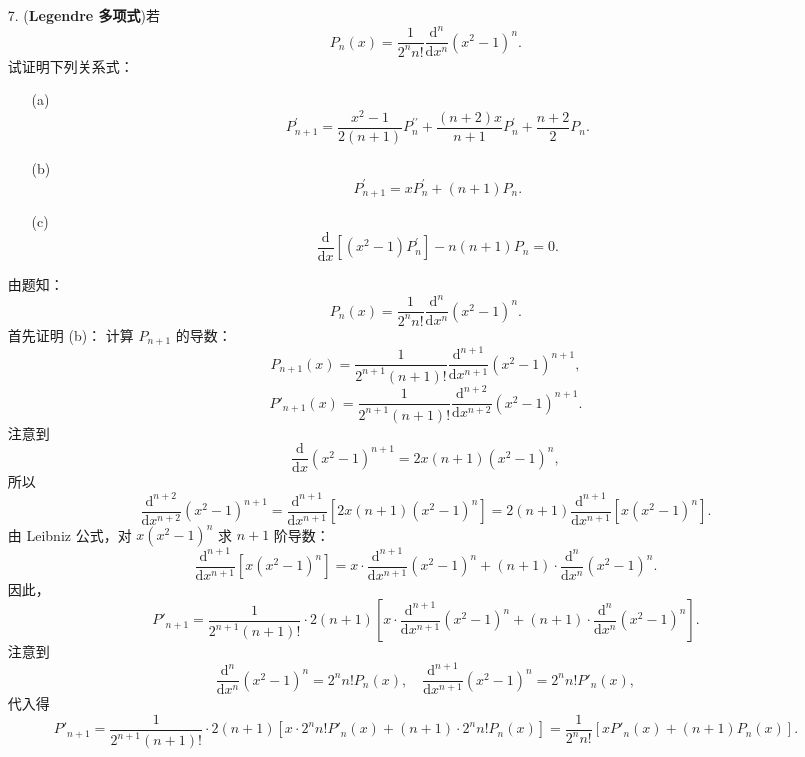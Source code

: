 \begin{enumerate}
    \item[7.](\textbf{Legendre 多项式})若
    \[
        \displaystyle P_n(x)=\frac{1}{2^nn!}\frac{\mathrm{d}^n}{\mathrm{d}x^n}(x^2-1)^n.
    \]
    试证明下列关系式：
    \begin{enumerate}
        \item[(a)]
        \[
            \displaystyle P^{\prime}_{n+1}=\frac{x^2-1}{2(n+1)}P^{\prime\prime}_n+\frac{(n+2)x}{n+1}P^{\prime}_n+\frac{n+2}{2}P_n.
        \]
        \item[(b)]
        \[
            \displaystyle P^{\prime}_{n+1}=xP^{\prime}_n + (n+1)P_n.
        \]
        \item[(c)]
        \[
            \displaystyle \frac{\mathrm{d}}{\mathrm{d}x}\left[ (x^2-1)P^{\prime}_n \right] - n(n+1)P_n =0.
        \]
    \end{enumerate}
    \begin{solution}
        由题知：
        \[
        P_n(x) = \frac{1}{2^n n!} \frac{\mathrm{d}^n}{\mathrm{d}x^n} (x^2-1)^n.
        \]
        首先证明 (b)：
        计算 $P_{n+1}$ 的导数：
        \[
        P_{n+1}(x) = \frac{1}{2^{n+1}(n+1)!} \frac{\mathrm{d}^{n+1}}{\mathrm{d}x^{n+1}} (x^2-1)^{n+1},
        \]
        \[
        P'_{n+1}(x) = \frac{1}{2^{n+1}(n+1)!} \frac{\mathrm{d}^{n+2}}{\mathrm{d}x^{n+2}} (x^2-1)^{n+1}.
        \]
        注意到
        \[
        \frac{\mathrm{d}}{\mathrm{d}x}(x^2-1)^{n+1} = 2x(n+1)(x^2-1)^n,
        \]
        所以
        \[
        \frac{\mathrm{d}^{n+2}}{\mathrm{d}x^{n+2}} (x^2-1)^{n+1} = \frac{\mathrm{d}^{n+1}}{\mathrm{d}x^{n+1}} \left[ 2x(n+1)(x^2-1)^n \right] = 2(n+1) \frac{\mathrm{d}^{n+1}}{\mathrm{d}x^{n+1}} \left[ x (x^2-1)^n \right].
        \]
        由 Leibniz 公式，对 $x (x^2-1)^n$ 求 $n+1$ 阶导数：
        \[
        \frac{\mathrm{d}^{n+1}}{\mathrm{d}x^{n+1}} [x (x^2-1)^n] = x \cdot \frac{\mathrm{d}^{n+1}}{\mathrm{d}x^{n+1}} (x^2-1)^n + (n+1) \cdot \frac{\mathrm{d}^n}{\mathrm{d}x^n} (x^2-1)^n.
        \]
        因此，
        \[
        P'_{n+1} = \frac{1}{2^{n+1}(n+1)!} \cdot 2(n+1) \left[ x \cdot \frac{\mathrm{d}^{n+1}}{\mathrm{d}x^{n+1}} (x^2-1)^n + (n+1) \cdot \frac{\mathrm{d}^n}{\mathrm{d}x^n} (x^2-1)^n \right].
        \]
        注意到
        \[
        \frac{\mathrm{d}^n}{\mathrm{d}x^n} (x^2-1)^n = 2^n n! P_n(x), \quad \frac{\mathrm{d}^{n+1}}{\mathrm{d}x^{n+1}} (x^2-1)^n = 2^n n! P'_n(x),
        \]
        代入得
        \[
        P'_{n+1} = \frac{1}{2^{n+1}(n+1)!} \cdot 2(n+1) \left[ x \cdot 2^n n! P'_n(x) + (n+1) \cdot 2^n n! P_n(x) \right] = \frac{1}{2^n n!} \left[ x P'_n(x) + (n+1) P_n(x) \right].
\]
\end{solution}
\end{enumerate}
